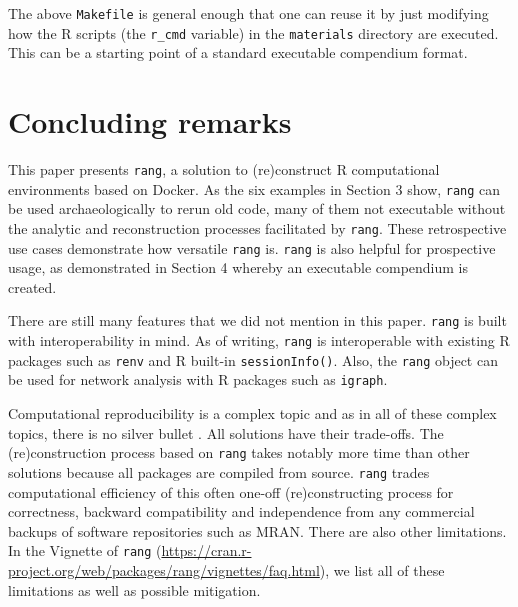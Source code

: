 \documentclass[
  10pt,
  letterpaper,
]{article}
\begin{document}
The above \texttt{Makefile} is general enough that one can reuse it by
just modifying how the R scripts (the \texttt{r\_cmd} variable) in the
\texttt{materials} directory are executed. This can be a starting point
of a standard executable compendium format.

\hypertarget{concluding-remarks}{%
\section{Concluding remarks}\label{concluding-remarks}}

This paper presents \texttt{rang}, a solution to (re)construct R
computational environments based on Docker. As the six examples in
Section 3 show, \texttt{rang} can be used archaeologically to rerun old
code, many of them not executable without the analytic and
reconstruction processes facilitated by \texttt{rang}. These
retrospective use cases demonstrate how versatile \texttt{rang} is.
\texttt{rang} is also helpful for prospective usage, as demonstrated in
Section 4 whereby an executable compendium is created.

There are still many features that we did not mention in this paper.
\texttt{rang} is built with interoperability in mind. As of writing,
\texttt{rang} is interoperable with existing R packages such as
\texttt{renv} and R built-in \texttt{sessionInfo()}. Also, the
\texttt{rang} object can be used for network analysis with R packages
such as \texttt{igraph}.

Computational reproducibility is a complex topic and as in all of these
complex topics, there is no silver bullet \citep{canon:2019:CPR}. All
solutions have their trade-offs. The (re)construction process based on
\texttt{rang} takes notably more time than other solutions because all
packages are compiled from source. \texttt{rang} trades computational
efficiency of this often one-off (re)constructing process for
correctness, backward compatibility and independence from any commercial
backups of software repositories such as MRAN. There are also other
limitations. In the Vignette of \texttt{rang}
(\url{https://cran.r-project.org/web/packages/rang/vignettes/faq.html}),
we list all of these limitations as well as possible mitigation.


\nolinenumbers
\renewcommand\refname{References}
  
\end{document}
